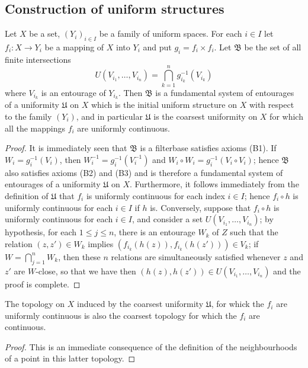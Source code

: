 \subsection{Construction of uniform structures}
\begin{proposition}\label{uniformity initial structure}
Let $X$ be a set, $(Y_i)_{i\in I}$ be a family of uniform spaces. For each $i\in I$ let $f_i:X\to Y_i$ be a mapping of $X$ into $Y_i$ and put $g_i=f_i\times f_i$. Let $\mathfrak{B}$ be the set of all finite intersections
\[U(V_{i_1},\dots,V_{i_n})=\bigcap_{k=1}^{n}g_{i_k}^{-1}(V_{i_k})\]
where $V_{i_k}$ is an entourage of $Y_{i_k}$. Then $\mathfrak{B}$ is a fundamental system of entourages of a uniformity $\mathfrak{U}$ on $X$ which is the initial uniform structure on $X$ with respect to the family $(Y_i)$, and in particular $\mathfrak{U}$ is the coarsest uniformity on $X$ for which all the mappings $f_i$ are uniformly continuous.
\end{proposition}
\begin{proof}
It is immediately seen that $\mathfrak{B}$ is a filterbase satisfies axioms (B1). If $W_i=g_i^{-1}(V_i)$, then $W_i^{-1}=g_i^{-1}(V_i^{-1})$ and $W_i\circ W_i=g_i^{-1}(V_i\circ V_i)$; hence $\mathfrak{B}$ also satisfies axioms (B2) and (B3) and is therefore a fundamental system of entourages of a uniformity $\mathfrak{U}$ on $X$. Furthermore, it follows immediately from the definition of $\mathfrak{U}$ that $f_i$ is uniformly continuous for each index $i\in I$; hence $f_i\circ h$ is uniformly continuous for each $i\in I$ if $h$ is. Conversely, suppose that $f_i\circ h$ is uniformly continuous for each $i\in I$, and consider a set $U(V_{i_1},\dots,V_{i_n})$; by hypothesis, for each $1\leq j\leq n$, there is an entourage $W_k$ of $Z$ such that the relation $(z,z')\in W_k$ implies $(f_{i_k}(h(z)),f_{i_k}(h(z')))\in V_k$; if $W=\bigcap_{j=1}^{n}W_k$, then these $n$ relations are simultaneously satisfied whenever $z$ and $z'$ are $W$-close, so that we have then $(h(z),h(z'))\in U(V_{i_1},\dots,V_{i_n})$ and the proof is complete.
\end{proof}
\begin{corollary}\label{uniformity initial structure is initial topology}
The topology on $X$ induced by the coarsest uniformity $\mathfrak{U}$, for whick the $f_i$ are uniformly continuous is also the coarsest topology for which the $f_i$ are continuous.
\end{corollary}
\begin{proof}
This is an immediate consequence of the definition of the neighbourhoods of a point in this latter topology.
\end{proof}
